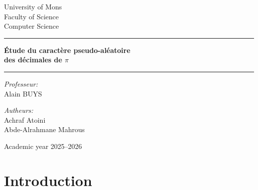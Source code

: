 \documentclass[11pt,a4paper]{report}
\begin{document}
\begin{titlepage}
    \centering

{\Large University of Mons}\\[0.2cm]
{\Large Faculty of Science}\\[0.2cm]
{\Large Computer Science}\\[2.5cm]

\begin{center}
\rule{0.65\textwidth}{0.4pt}

\vspace{0.8cm}

    {\LARGE\bfseries
    Étude du caractère pseudo-aléatoire\\
    des décimales de $\pi$
    }

    \vspace{0.8cm}

    \rule{0.65\textwidth}{0.4pt}

    \vspace{2.2cm}
\end{center}

    \begin{minipage}[t]{0.45\textwidth}
        \raggedright
        \large \textit{Professeur:}\\
        Alain BUYS\\[0.5cm]
    \end{minipage}
    \hfill
    \begin{minipage}[t]{0.45\textwidth}
        \raggedleft
        \large \textit{Autheurs:}\\
        \large Achraf Atoini\\
        \large Abde-Alrahmane Mahrous\\
    \end{minipage}

    \vfill


    \vspace{1cm}
    {\Large Academic year 2025--2026}
\end{titlepage}

\tableofcontents
\thispagestyle{empty}
\newpage

\chapter{Introduction}
\end{document}

